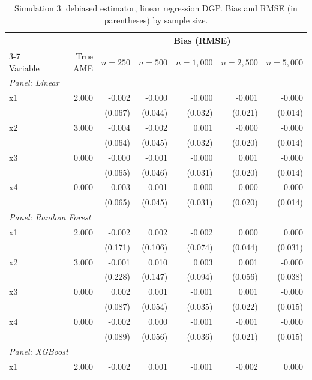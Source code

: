 \documentclass[12pt]{article}
\begin{document}
	\begin{table}[htbp]
		\centering
		\small
		\begin{threeparttable}
			\caption{Simulation 3: debiased estimator, linear regression DGP. Bias and RMSE (in parentheses) by sample size.}
			\label{tab:sim3_bias_regression_linear}
			\begin{tabular}{lrrrrrr}
				\toprule
				& & \multicolumn{5}{c}{Bias (RMSE)} \\
				\cmidrule(lr){3-7}
				Variable & True AME & $n=250$ & $n=500$ & $n=1,000$ & $n=2,500$ & $n=5,000$ \\
				\midrule
				\multicolumn{7}{l}{\textit{Panel: Linear}} \\
				\quad x1 & 2.000 & -0.002 & -0.000 & -0.000 & -0.001 & -0.000 \\
				&  & (0.067) & (0.044) & (0.032) & (0.021) & (0.014) \\
				\quad x2 & 3.000 & -0.004 & -0.002 & 0.001 & -0.000 & -0.000 \\
				&  & (0.064) & (0.045) & (0.032) & (0.020) & (0.014) \\
				\quad x3 & 0.000 & -0.000 & -0.001 & -0.000 & 0.001 & -0.000 \\
				&  & (0.065) & (0.046) & (0.031) & (0.020) & (0.014) \\
				\quad x4 & 0.000 & -0.003 & 0.001 & -0.000 & -0.000 & -0.000 \\
				&  & (0.065) & (0.045) & (0.031) & (0.020) & (0.014) \\
				\midrule
				\multicolumn{7}{l}{\textit{Panel: Random Forest}} \\
				\quad x1 & 2.000 & -0.002 & 0.002 & -0.002 & 0.000 & 0.000 \\
				&  & (0.171) & (0.106) & (0.074) & (0.044) & (0.031) \\
				\quad x2 & 3.000 & -0.001 & 0.010 & 0.003 & 0.001 & -0.000 \\
				&  & (0.228) & (0.147) & (0.094) & (0.056) & (0.038) \\
				\quad x3 & 0.000 & 0.002 & 0.001 & -0.001 & 0.001 & -0.000 \\
				&  & (0.087) & (0.054) & (0.035) & (0.022) & (0.015) \\
				\quad x4 & 0.000 & -0.002 & 0.000 & -0.001 & -0.001 & -0.000 \\
				&  & (0.089) & (0.056) & (0.036) & (0.021) & (0.015) \\
				\midrule
				\multicolumn{7}{l}{\textit{Panel: XGBoost}} \\
				\quad x1 & 2.000 & -0.002 & 0.001 & -0.001 & -0.002 & 0.000 \\

\end{tabular}
\end{threeparttable}
\end{table}
\end{document}
